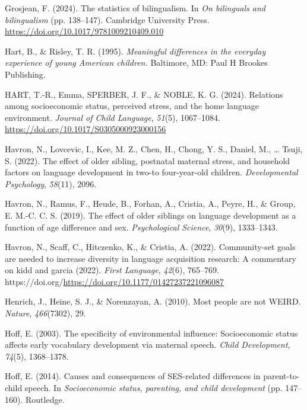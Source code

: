 \documentclass[
  man,floatsintext]{apa6}
\newlength{\cslhangindent}
\newenvironment{CSLReferences}[2] %
 {\begin{list}{}{%
  \setlength{\itemindent}{0pt}
  \setlength{\leftmargin}{0pt}
  \setlength{\parsep}{0pt}
  \ifodd #1
   \setlength{\leftmargin}{\cslhangindent}
   \setlength{\itemindent}{-1\cslhangindent}
  \fi
  \setlength{\itemsep}{#2\baselineskip}}}
 {\end{list}}
\begin{document}
\begin{CSLReferences}{1}{0}
Grosjean, F. (2024). The statistics of bilingualism. In \emph{On bilinguals and bilingualism} (pp. 138--147). Cambridge University Press. \url{https://doi.org/10.1017/9781009210409.010}

Hart, B., \& Risley, T. R. (1995). \emph{Meaningful differences in the everyday experience of young {A}merican children.} Baltimore, MD: Paul H Brookes Publishing.

HART, T.-R., Emma, SPERBER, J. F., \& NOBLE, K. G. (2024). Relations among socioeconomic status, perceived stress, and the home language environment. \emph{Journal of Child Language}, \emph{51}(5), 1067--1084. \url{https://doi.org/10.1017/S0305000923000156}

Havron, N., Lovcevic, I., Kee, M. Z., Chen, H., Chong, Y. S., Daniel, M., \ldots{} Tsuji, S. (2022). The effect of older sibling, postnatal maternal stress, and household factors on language development in two-to four-year-old children. \emph{Developmental Psychology}, \emph{58}(11), 2096.

Havron, N., Ramus, F., Heude, B., Forhan, A., Cristia, A., Peyre, H., \& Group, E. M.-C. C. S. (2019). The effect of older siblings on language development as a function of age difference and sex. \emph{Psychological Science}, \emph{30}(9), 1333--1343.

Havron, N., Scaff, C., Hitczenko, K., \& Cristia, A. (2022). Community-set goals are needed to increase diversity in language acquisition research: A commentary on kidd and garcia (2022). \emph{First Language}, \emph{42}(6), 765--769. https://doi.org/\url{https://doi.org/10.1177/01427237221096087}

Henrich, J., Heine, S. J., \& Norenzayan, A. (2010). Most people are not WEIRD. \emph{Nature}, \emph{466}(7302), 29.

Hoff, E. (2003). The specificity of environmental influence: Socioeconomic status affects early vocabulary development via maternal speech. \emph{Child Development}, \emph{74}(5), 1368--1378.

Hoff, E. (2014). Causes and consequences of SES-related differences in parent-to-child speech. In \emph{Socioeconomic status, parenting, and child development} (pp. 147--160). Routledge.


\end{CSLReferences}
\end{document}
